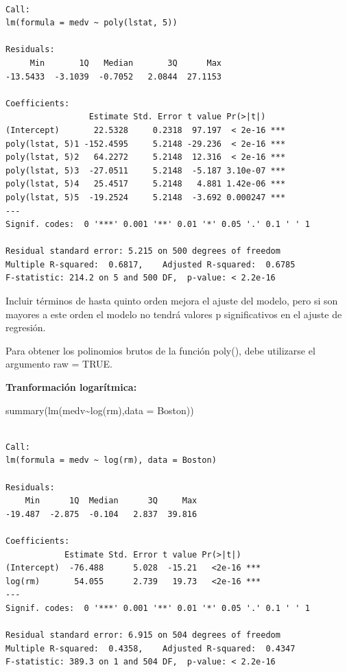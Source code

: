 \documentclass[
  letterpaper,
  DIV=11,
  numbers=noendperiod]{scrartcl}
\newenvironment{Shaded}{\begin{snugshade}}{\end{snugshade}}
\newcommand{\AttributeTok}[1]{\textcolor[rgb]{0.40,0.45,0.13}{#1}}
\newcommand{\FunctionTok}[1]{\textcolor[rgb]{0.28,0.35,0.67}{#1}}
\newcommand{\NormalTok}[1]{\textcolor[rgb]{0.00,0.23,0.31}{#1}}
\newcommand{\SpecialCharTok}[1]{\textcolor[rgb]{0.37,0.37,0.37}{#1}}
\begin{document}
\begin{verbatim}

Call:
lm(formula = medv ~ poly(lstat, 5))

Residuals:
     Min       1Q   Median       3Q      Max 
-13.5433  -3.1039  -0.7052   2.0844  27.1153 

Coefficients:
                 Estimate Std. Error t value Pr(>|t|)    
(Intercept)       22.5328     0.2318  97.197  < 2e-16 ***
poly(lstat, 5)1 -152.4595     5.2148 -29.236  < 2e-16 ***
poly(lstat, 5)2   64.2272     5.2148  12.316  < 2e-16 ***
poly(lstat, 5)3  -27.0511     5.2148  -5.187 3.10e-07 ***
poly(lstat, 5)4   25.4517     5.2148   4.881 1.42e-06 ***
poly(lstat, 5)5  -19.2524     5.2148  -3.692 0.000247 ***
---
Signif. codes:  0 '***' 0.001 '**' 0.01 '*' 0.05 '.' 0.1 ' ' 1

Residual standard error: 5.215 on 500 degrees of freedom
Multiple R-squared:  0.6817,    Adjusted R-squared:  0.6785 
F-statistic: 214.2 on 5 and 500 DF,  p-value: < 2.2e-16
\end{verbatim}

Incluir términos de hasta quinto orden mejora el ajuste del modelo, pero
si son mayores a este orden el modelo no tendrá valores p significativos
en el ajuste de regresión.

Para obtener los polinomios brutos de la función poly(), debe utilizarse
el argumento raw = TRUE.

\textbf{Tranformación logarítmica:}

\begin{Shaded}
\begin{Highlighting}[]
\FunctionTok{summary}\NormalTok{(}\FunctionTok{lm}\NormalTok{(medv}\SpecialCharTok{\textasciitilde{}}\FunctionTok{log}\NormalTok{(rm),}\AttributeTok{data =}\NormalTok{ Boston))}
\end{Highlighting}
\end{Shaded}

\begin{verbatim}

Call:
lm(formula = medv ~ log(rm), data = Boston)

Residuals:
    Min      1Q  Median      3Q     Max 
-19.487  -2.875  -0.104   2.837  39.816 

Coefficients:
            Estimate Std. Error t value Pr(>|t|)    
(Intercept)  -76.488      5.028  -15.21   <2e-16 ***
log(rm)       54.055      2.739   19.73   <2e-16 ***
---
Signif. codes:  0 '***' 0.001 '**' 0.01 '*' 0.05 '.' 0.1 ' ' 1

Residual standard error: 6.915 on 504 degrees of freedom
Multiple R-squared:  0.4358,    Adjusted R-squared:  0.4347 
F-statistic: 389.3 on 1 and 504 DF,  p-value: < 2.2e-16
\end{verbatim}
\end{document}
